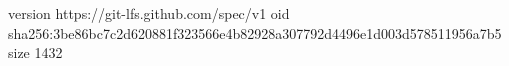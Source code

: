 version https://git-lfs.github.com/spec/v1
oid sha256:3be86bc7c2d620881f323566e4b82928a307792d4496e1d003d578511956a7b5
size 1432
